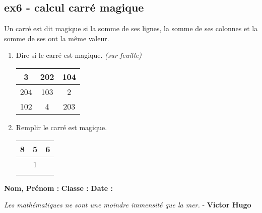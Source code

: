 \documentclass[11pt]{article}
\begin{document}
\begin{multicols}{2}

  \subsection*{ex6 - calcul carré magique}

  Un carré est dit magique si la somme de ses lignes, la somme de ses colonnes et la somme de ses ont la même valeur. 
  \begin{enumerate}
  \item  Dire si le carré est magique. \textit{(sur feuille)}

    \begin{center}
      \begin{tabular}{|c|c|c|} \hline
        3 & 202 & 104 \\ \hline
        204 & 103 &   2 \\ \hline
        102 &   4 & 203 \\ \hline
      \end{tabular}
    \end{center}


  \item  Remplir le carré est magique.
    \begin{center}
      \begin{tabular}{|c|c|c|} \hline
        8 & 5 & 6  \\ \hline
        & 1 &    \\ \hline
        &   &    \\ \hline
      \end{tabular}
    \end{center}

  \end{enumerate}

\end{multicols}

\newpage

\textbf{Nom, Prénom :} \hspace{8cm} \textbf{Classe :} \hspace{3cm} \textbf{Date :}\\

\begin{center}
  \textit{Les mathématiques ne sont une moindre immensité que la mer.}  - \textbf{Victor Hugo}
\end{center}
\end{document}
